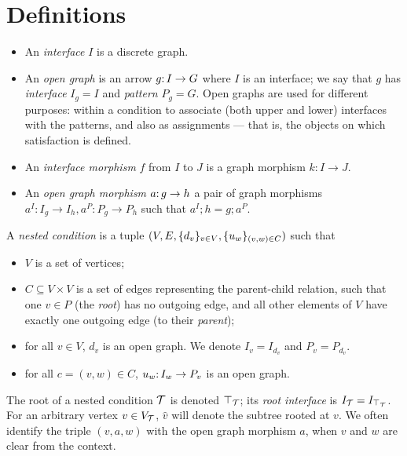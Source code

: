 \section{Definitions}
\label{sec:definitions}

\begin{itemize}
\item An \emph{interface} $I$ is a discrete graph.

\item An \emph{open graph} is an arrow $g{:}\, I\rightarrow G$ where $I$ is an interface; we say that $g$ has \emph{interface} $I_g=I$ and \emph{pattern} $P_g=G$. Open graphs are used for different purposes: within a condition to associate (both upper and lower) interfaces with the patterns, and also as assignments --- that is, the objects on which satisfaction is defined.

\item An \emph{interface morphism} $f$ from $I$ to $J$ is a graph morphism $k:I\to J$.

\item An \emph{open graph morphism} $a{:}\, g\rightarrow h$ a pair of graph morphisms $a^I:I_g\to I_h, a^P:P_g\to P_h$ such that $a^I;h=g;a^P$.
\end{itemize}
%
\begin{definition}\label{def:nested condition}
A \emph{nested condition} is a tuple $(V,E,\{{d_v}\}_{v\in V},\{{u_w}\}_{(v,w)\in C})$ such that

\begin{itemize}[topsep=\smallskipamount]
\item $V$ is a set of vertices;

\item $C\subseteq V\times V$ is a set of edges representing the parent-child relation, such that one $v\in P$ (the \emph{root}) has no outgoing edge, and all other elements of $V$ have exactly one outgoing edge (to their \emph{parent});

\item for all $v\in V$, $d_v$ is an open graph. We denote $I_v=I_{d_v}$ and $P_v=P_{d_v}$.

\item for all $c=(v,w)\in C$, $u_w{:}\, I_w\rightarrow P_v$ is an open graph.
\end{itemize}
\end{definition}
%
The root of a nested condition ${\mathcal{T}}$ is denoted $\top_{{\mathcal{T}}}$; its \emph{root interface} is $I_{\mathcal{T}}=I_{\top_{{\mathcal{T}}}}$. For an arbitrary vertex $v\in V_{\mathcal{T}}$, $\hat v$ will denote the subtree rooted at $v$. We often identify the triple $(v,a,w)$ with the open graph morphism $a$, when $v$ and $w$ are clear from the context.

